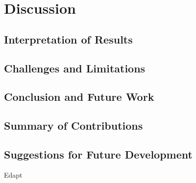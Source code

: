 \chapter{Discussion}
  \label{sec:discussion}

  \section{Interpretation of Results}
  \label{subsec:interpretation-results}

  \section{Challenges and Limitations}
  \label{subsec:challenges-limitations}

  \section{Conclusion and Future Work}
  \label{sec:conclusion}

  \section{Summary of Contributions}
  \label{subsec:summary-contributions}

  \section{Suggestions for Future Development}
  \label{subsec:suggestions-future-development}

  Edapt